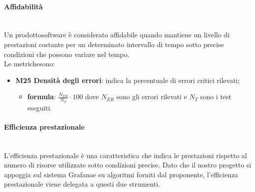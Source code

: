 	\paragraph{Affidabilità} \mbox{}\\[1mm]
	Un prodotto\glosp software è considerato affidabile quando mantiene un livello di prestazioni costante per un determinato intervallo di tempo sotto precise condizioni che possono variare nel tempo.\\
	Le metriche\glosp sono:
	\begin{itemize}
		\item \textbf{M25 Densità degli errori}: indica la percentuale di errori critici rilevati; 
		\begin{itemize}
			\item[] \textbf{formula}: $\frac{N_{ER}}{N_{T}}\cdot100$ dove $N_{ER}$ sono gli errori rilevati e $N_T$ sono i test eseguiti.
		\end{itemize}
	\end{itemize}

	\paragraph{Efficienza prestazionale} \mbox{}\\
	L'efficienza prestazionale è una caratteristica che indica le prestazioni rispetto al numero di risorse utilizzate sotto condizioni precise. Dato che il nostro progetto si appoggia sul sistema Grafana\glosp e su algoritmi forniti dal proponente, l'efficienza prestazionale viene delegata a questi due strumenti.
		
